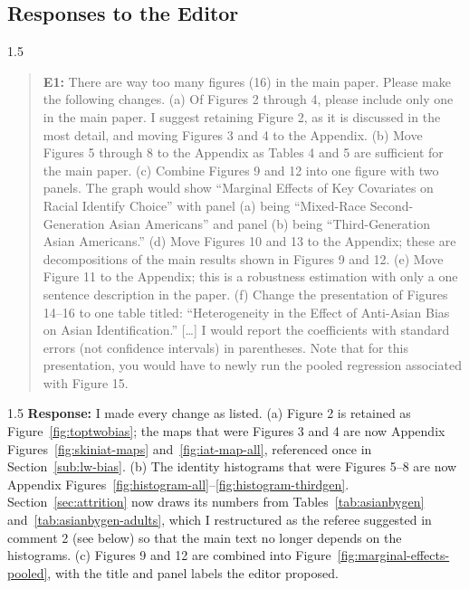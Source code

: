 \documentclass[12pt,english]{article}
\newcommand{\rrxspc}{1.5}
\begin{document}
\begin{refsection}
    \section{Responses to the Editor}
        \begin{spacing}{\rrxspc}
            \begin{quotation}
                \textbf{E1: } There are way too many figures (16) in the main paper. Please make the following changes. (a) Of Figures 2 through 4, please include only one in the main paper. I suggest retaining Figure 2, as it is discussed in the most detail, and moving Figures 3 and 4 to the Appendix. (b) Move Figures 5 through 8 to the Appendix as Tables 4 and 5 are sufficient for the main paper. (c) Combine Figures 9 and 12 into one figure with two panels. The graph would show ``Marginal Effects of Key Covariates on Racial Identify Choice'' with panel (a) being ``Mixed-Race Second-Generation Asian Americans'' and panel (b) being ``Third-Generation Asian Americans.'' (d) Move Figures 10 and 13 to the Appendix; these are decompositions of the main results shown in Figures 9 and 12. (e) Move Figure 11 to the Appendix; this is a robustness estimation with only a one sentence description in the paper. (f) Change the presentation of Figures 14--16 to one table titled: ``Heterogeneity in the Effect of Anti-Asian Bias on Asian Identification.'' [\ldots] I would report the coefficients with standard errors (not confidence intervals) in parentheses. Note that for this presentation, you would have to newly run the pooled regression associated with Figure 15.
            \end{quotation}
        \end{spacing}
        \begin{spacing}{\rrxspc}
        \textbf{Response:} I made every change as listed.
        (a) Figure 2 is retained as Figure~\ref{fig:toptwobias}; the maps that were Figures 3 and 4 are now Appendix Figures~\ref{fig:skiniat-maps} and~\ref{fig:iat-map-all}, referenced once in Section~\ref{sub:lw-bias}.
        (b) The identity histograms that were Figures 5--8 are now Appendix Figures~\ref{fig:histogram-all}--\ref{fig:histogram-thirdgen}. Section~\ref{sec:attrition} now draws its numbers from Tables~\ref{tab:asianbygen} and~\ref{tab:asianbygen-adults}, which I restructured as the referee suggested in comment 2 (see below) so that the main text no longer depends on the histograms.
        (c) Figures 9 and 12 are combined into Figure~\ref{fig:marginal-effects-pooled}, with the title and panel labels the editor proposed.

\end{spacing}
\end{refsection}
\end{document}
